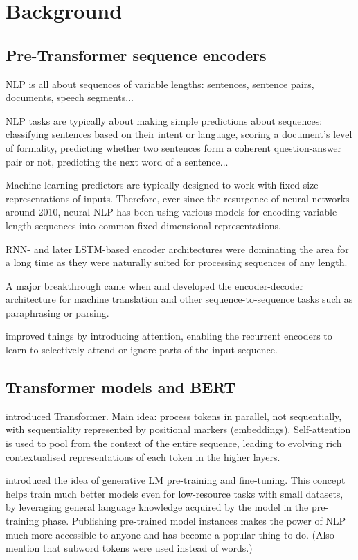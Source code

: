 \documentclass[bsc,frontabs,twoside,singlespacing,parskip,deptreport]{infthesis}
\begin{document}
\chapter{Background}{
  \section{Pre-Transformer sequence encoders}{
    NLP is all about sequences of variable lengths: sentences, sentence pairs, documents, speech segments...

    NLP tasks are typically about making simple predictions about sequences: classifying sentences based on their intent or language, scoring a document's level of formality, predicting whether two sentences form a coherent question-answer pair or not, predicting the next word of a sentence...

    Machine learning predictors are typically designed to work with fixed-size representations of inputs. Therefore, ever since the resurgence of neural networks around 2010, neural NLP has been using various models for encoding variable-length sequences into common fixed-dimensional representations.

    RNN- and later LSTM-based encoder architectures were dominating the area for a long time as they were naturally suited for processing sequences of any length.

    A major breakthrough came when \citet{Kalchbrenner_2013} and \citet{Sutskever_2014} developed the encoder-decoder architecture for machine translation and other sequence-to-sequence tasks such as paraphrasing or parsing.

    \citet{Bahdanau_2014} improved things by introducing attention, enabling the recurrent encoders to learn to selectively attend or ignore parts of the input sequence.
  }

  \section{Transformer models and BERT}{
    \citet{Vaswani_2017} introduced Transformer. Main idea: process tokens in parallel, not sequentially, with sequentiality represented by positional markers (embeddings). Self-attention is used to pool from the context of the entire sequence, leading to evolving rich contextualised representations of each token in the higher layers.
    
    \citet{Radford_2018} introduced the idea of generative LM pre-training and fine-tuning. This concept helps train much better models even for low-resource tasks with small datasets, by leveraging general language knowledge acquired by the model in the pre-training phase. Publishing pre-trained model instances makes the power of NLP much more accessible to anyone and has become a popular thing to do. (Also mention that subword tokens were used instead of words.)
    
}}
\end{document}
